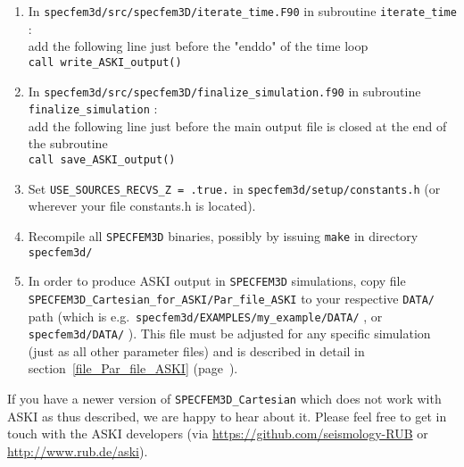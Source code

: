 \documentclass[12pt,a4paper]{article}
\newcommand{\lcode}[1]{\nolinkurl{#1}}
\newcommand{\ASKI}{ {\ttfamily ASKI} }
\newcommand{\myref}[1]{\ref{#1} (page~\pageref{#1})}
\begin{document}
\begin{enumerate}
\item In \lcode{specfem3d/src/specfem3D/iterate_time.F90} in subroutine \lcode{iterate_time} :\\
   add the following line just before the "enddo" of the time loop\\
   \lcode{call write_ASKI_output()}

\item In \lcode{specfem3d/src/specfem3D/finalize_simulation.f90} in subroutine \lcode{finalize_simulation} :\\
   add the following line just before the main output file is closed at the end of the subroutine\\
   \lcode{call save_ASKI_output()}

\item Set \lcode{USE_SOURCES_RECVS_Z = .true.} in \lcode{specfem3d/setup/constants.h} (or wherever 
   your file constants.h is located).

\item Recompile all \lcode{SPECFEM3D} binaries, possibly by issuing \lcode{make} in directory \lcode{specfem3d/}

\item In order to produce \ASKI{} output in \lcode{SPECFEM3D} simulations, copy file 
    \lcode{SPECFEM3D_Cartesian_for_ASKI/Par_file_ASKI} to your respective \lcode{DATA/} path
    (which is e.g.\ \lcode{specfem3d/EXAMPLES/my_example/DATA/} , or \lcode{specfem3d/DATA/} ). This 
    file must be adjusted for any specific simulation (just as all other parameter files) and is described in 
    detail in section~\myref{file_Par_file_ASKI}.

\end{enumerate}

If you have a newer version of \lcode{SPECFEM3D_Cartesian} which does not work with \ASKI{} as thus described, we
are happy to hear about it. Please feel free to get in touch with the \ASKI{} developers (via
\url{https://github.com/seismology-RUB} or \url{http://www.rub.de/aski}). 

%
\end{document}

